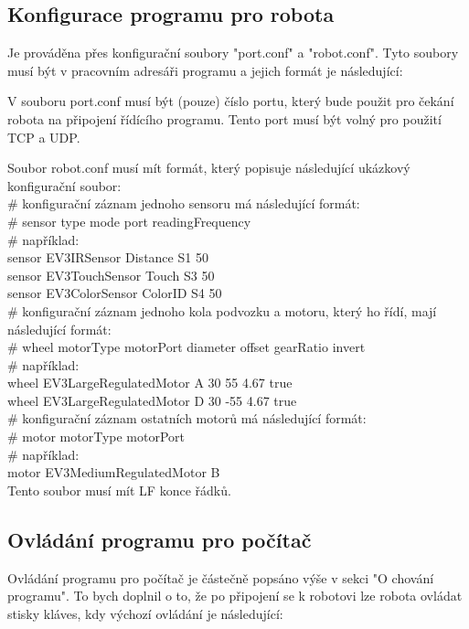 \documentclass[12pt, ngerman]{article}
\begin{document}
\subsection{Konfigurace programu pro robota}
Je prováděna přes konfigurační soubory "port.conf" a "robot.conf". Tyto soubory musí být v pracovním adresáři programu a jejich formát je následující:

V souboru port.conf musí být (pouze) číslo portu, který bude použit pro čekání robota na připojení řídícího programu. Tento port musí být volný pro použití TCP a UDP.

Soubor robot.conf musí mít formát, který popisuje následující ukázkový konfigurační soubor:\\

\# konfigurační záznam jednoho sensoru má následující formát:\\
\# sensor type           mode     port readingFrequency\\
\# například:\\
sensor  EV3IRSensor    Distance S1   50\\
sensor  EV3TouchSensor Touch    S3   50\\
sensor  EV3ColorSensor ColorID  S4   50\\

\# konfigurační záznam jednoho kola podvozku a motoru, který ho řídí, mají následující formát:\\
\# wheel motorType              motorPort diameter offset gearRatio invert\\
\# například:\\
wheel  EV3LargeRegulatedMotor A         30       55     4.67      true\\
wheel  EV3LargeRegulatedMotor D         30       -55    4.67      true\\

\# konfigurační záznam ostatních motorů má následující formát:\\
\# motor motorType               motorPort\\
\# například:\\
motor  EV3MediumRegulatedMotor B\\

Tento soubor musí mít LF konce řádků.

\subsection{Ovládání programu pro počítač}
Ovládání programu pro počítač je částečně popsáno výše v sekci "O chování programu". To bych doplnil o to, že po připojení se k robotovi lze robota ovládat stisky kláves, kdy výchozí ovládání je následující:\\
\end{document}
